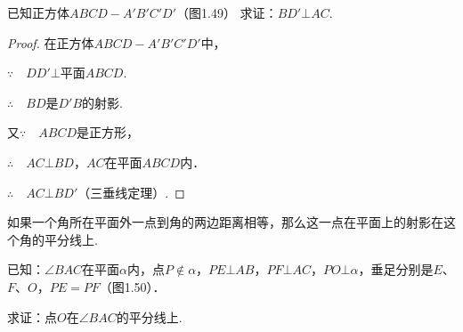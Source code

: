 \begin{example}
已知正方体$ABCD-A'B'C'D'$（图1.49）
求证：$BD'\bot AC$.
\end{example}

\noindent
\begin{minipage}{.6\textwidth}\CTEXindent
    \begin{proof}
        在正方体$ABCD-A'B'C'D'$中，
    
    $\because\quad DD'\bot$平面$ABCD$.
    
    $\therefore\quad BD$是$D'B$的射影.
    
    又$\because\quad ABCD$是正方形，
    
    $\therefore\quad AC\bot BD$，$AC$在平面$ABCD$内．
    
    $\therefore\quad AC\bot BD'$（三垂线定理）.
    \end{proof}
\end{minipage}
\hfill
\begin{minipage}{.38\textwidth}
\centering
{}
\end{minipage}



\begin{example}
    如果一个角所在平面外一点到角的两边距离相等，那么这一点在平面上的射影在这个角的平分线上.

已知：$\angle BAC$在平面$\alpha$内，点$P\notin \alpha$，$PE\bot AB$，$PF\bot AC$，$PO\bot \alpha$，垂足分别是$E$、$F$、$O$，$PE=PF$（图1.50）．

求证：点$O$在$\angle BAC$的平分线上.
\end{example}



